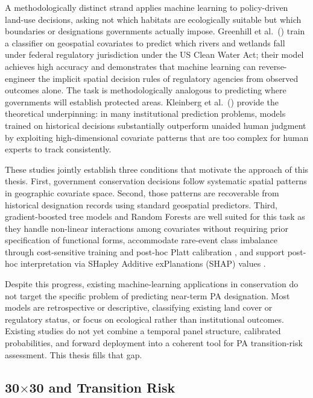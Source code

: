 \documentclass[12pt]{article}
\theoremstyle{break}
\begin{document}
A methodologically distinct strand applies machine learning to policy-driven land-use
decisions, asking not which habitats are ecologically suitable but which boundaries
or designations governments actually impose.
Greenhill et al.\ (\citeyear{greenhill2024}) train a classifier on geospatial covariates
to predict which rivers and wetlands fall under federal regulatory jurisdiction under
the US Clean Water Act; their model achieves high accuracy and demonstrates that
machine learning can reverse-engineer the implicit spatial decision rules of regulatory
agencies from observed outcomes alone. The task is methodologically analogous to
predicting where governments will establish protected areas.
Kleinberg et al.\ (\citeyear{kleinberg2018}) provide the theoretical underpinning:
in many institutional prediction problems, models trained on historical decisions
substantially outperform unaided human judgment by exploiting high-dimensional
covariate patterns that are too complex for human experts to track consistently.

These studies jointly establish three conditions that motivate the approach of this
thesis. First, government conservation decisions follow systematic spatial patterns
in geographic covariate space. Second, those patterns are recoverable from
historical designation records using standard geospatial predictors. Third, 
gradient-boosted tree models and Random Forests \citep{ke2017, breiman2001} 
are well suited for this task as they handle
non-linear interactions among covariates without requiring prior specification of
functional forms, accommodate rare-event class imbalance through cost-sensitive
training and post-hoc Platt calibration \citep{niculescumizil2005}, and support
post-hoc interpretation via SHapley Additive exPlanations (SHAP) values
\citep{lundberg2017}.

Despite this progress, existing machine-learning applications in conservation do not
target the specific problem of predicting near-term PA designation.
Most models are retrospective or descriptive, classifying existing land cover or
regulatory status, or focus on ecological rather than institutional outcomes. Existing
studies do not yet combine a temporal panel structure, calibrated probabilities, and
forward deployment into a coherent tool for PA transition-risk assessment. This thesis
fills that gap.

\subsection{30$\times$30 and Transition Risk}
\label{sec:lit_transition}
\end{document}
